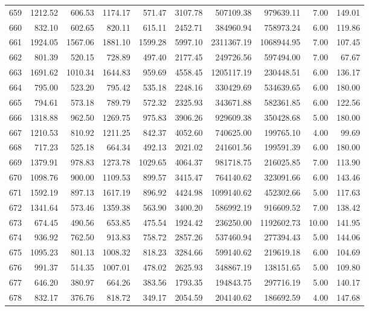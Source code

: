 \begin{tabular}{lrrrrrrrrr}
659 & 1212.52 & 606.53 & 1174.17 & 571.47 & 3107.78 & 507109.38 & 979639.11 & 7.00 & 149.01 \\
660 & 832.10 & 602.65 & 820.11 & 615.11 & 2452.71 & 384960.94 & 758973.24 & 6.00 & 119.86 \\
661 & 1924.05 & 1567.06 & 1881.10 & 1599.28 & 5997.10 & 2311367.19 & 1068944.95 & 7.00 & 107.45 \\
662 & 801.39 & 520.15 & 728.89 & 497.40 & 2177.45 & 249726.56 & 597494.00 & 7.00 & 67.67 \\
663 & 1691.62 & 1010.34 & 1644.83 & 959.69 & 4558.45 & 1205117.19 & 230448.51 & 6.00 & 136.17 \\
664 & 795.00 & 523.20 & 795.42 & 535.18 & 2248.16 & 330429.69 & 534639.65 & 6.00 & 180.00 \\
665 & 794.61 & 573.18 & 789.79 & 572.32 & 2325.93 & 343671.88 & 582361.85 & 6.00 & 122.56 \\
666 & 1318.88 & 962.50 & 1269.75 & 975.83 & 3906.26 & 929609.38 & 350428.68 & 5.00 & 180.00 \\
667 & 1210.53 & 810.92 & 1211.25 & 842.37 & 4052.60 & 740625.00 & 199765.10 & 4.00 & 99.69 \\
668 & 717.23 & 525.18 & 664.34 & 492.13 & 2021.02 & 241601.56 & 199591.39 & 6.00 & 180.00 \\
669 & 1379.91 & 978.83 & 1273.78 & 1029.65 & 4064.37 & 981718.75 & 216025.85 & 7.00 & 113.90 \\
670 & 1098.76 & 900.00 & 1109.53 & 899.57 & 3415.47 & 764140.62 & 323091.66 & 6.00 & 143.46 \\
671 & 1592.19 & 897.13 & 1617.19 & 896.92 & 4424.98 & 1099140.62 & 452302.66 & 5.00 & 117.63 \\
672 & 1341.64 & 573.46 & 1359.38 & 563.90 & 3400.20 & 586992.19 & 916609.52 & 7.00 & 138.42 \\
673 & 674.45 & 490.56 & 653.85 & 475.54 & 1924.42 & 236250.00 & 1192602.73 & 10.00 & 141.95 \\
674 & 936.92 & 762.50 & 913.83 & 758.72 & 2857.26 & 537460.94 & 277394.43 & 5.00 & 144.06 \\
675 & 1095.23 & 801.13 & 1008.32 & 818.23 & 3284.66 & 599140.62 & 219619.18 & 6.00 & 104.69 \\
676 & 991.37 & 514.35 & 1007.01 & 478.02 & 2625.93 & 348867.19 & 138151.65 & 5.00 & 109.80 \\
677 & 646.20 & 380.97 & 664.26 & 383.56 & 1793.35 & 194843.75 & 297716.19 & 5.00 & 140.17 \\
678 & 832.17 & 376.76 & 818.72 & 349.17 & 2054.59 & 204140.62 & 186692.59 & 4.00 & 147.68 \\

\end{tabular}
